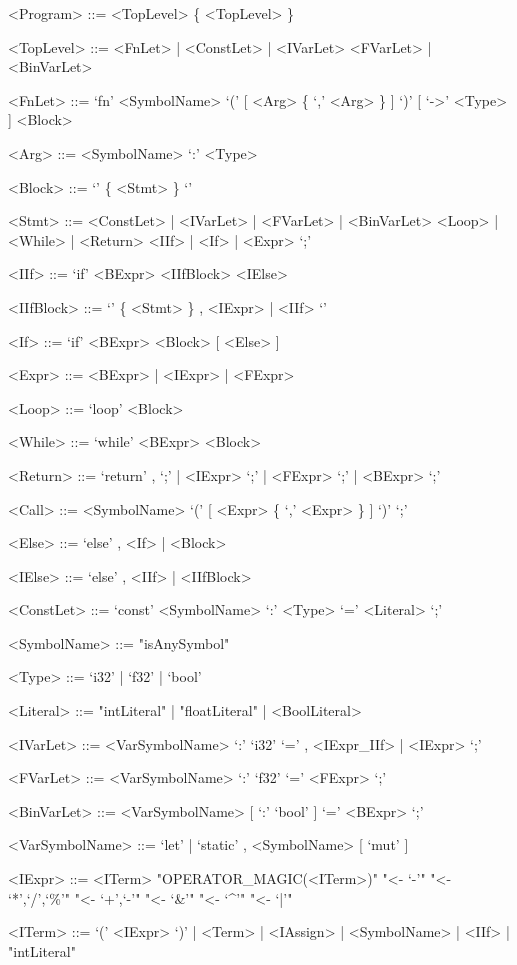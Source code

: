 \documentclass[12pt,a4paper]{article}
\begin{document}
\begin{grammar}
<Program> ::= <TopLevel> \{ <TopLevel> \}

<TopLevel> ::= <FnLet> | <ConstLet> | <IVarLet>
\alt <FVarLet> | <BinVarLet>

<FnLet> ::= `fn' <SymbolName> `(' [ <Arg> \{ `,' <Arg> \} ] `)' [ `->' <Type> ] <Block>

<Arg> ::= <SymbolName> `:' <Type>

<Block> ::= `{' \{ <Stmt> \} `}'

<Stmt> ::= <ConstLet> | <IVarLet> | <FVarLet> | <BinVarLet>
\alt <Loop> | <While> | <Return>
\alt <IIf> | <If> | <Expr> `;'

<IIf> ::= `if' <BExpr> <IIfBlock> <IElse>

<IIfBlock> ::= `{' \{ <Stmt> \} , <IExpr> | <IIf> `}'

<If> ::= `if' <BExpr> <Block> [ <Else> ]

<Expr> ::= <BExpr> | <IExpr> | <FExpr>

<Loop> ::= `loop' <Block>

<While> ::= `while' <BExpr> <Block>

<Return> ::= `return' , `;' | <IExpr> `;' | <FExpr> `;' | <BExpr> `;'

<Call> ::= <SymbolName> `(' [ <Expr> \{ `,' <Expr> \} ] `)' `;'

<Else> ::= `else' , <If> | <Block>

<IElse> ::= `else' , <IIf> | <IIfBlock>

<ConstLet> ::= `const' <SymbolName> `:' <Type> `=' <Literal> `;'

<SymbolName> ::= "isAnySymbol"

<Type> ::= `i32' | `f32' | `bool'

<Literal> ::= "intLiteral" | "floatLiteral" | <BoolLiteral>

<IVarLet> ::= <VarSymbolName> `:' `i32' `=' , <IExpr_IIf> | <IExpr> `;'

<FVarLet> ::= <VarSymbolName> `:' `f32' `=' <FExpr> `;'

<BinVarLet> ::= <VarSymbolName> [ `:' `bool' ] `=' <BExpr> `;'

<VarSymbolName> ::= `let' | `static' , <SymbolName> [ `mut' ]

<IExpr> ::= <ITerm>
\alt "OPERATOR_MAGIC(<ITerm>)" "<- `-'" "<- `*',`/',`\%'" "<- `+',`-'" "<- `&'" "<- `^'" "<- `|'"

<ITerm> ::= `(' <IExpr> `)' | <Term> | <IAssign> | <SymbolName> | <IIf> | "intLiteral"


\end{grammar}
\end{document}
